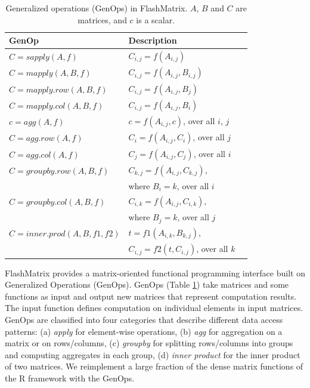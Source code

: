 \begin{table}
\begin{center}
\footnotesize
\begin{tabular}{|l|l|l|}
\hline
GenOp & Description \\
\hline
$C=sapply(A, f)$ & $C_{i,j}=f(A_{i,j})$ \\
\hline
$C=mapply(A, B, f)$ & $C_{i,j}=f(A_{i,j}, B_{i,j})$ \\
\hline
$C=mapply.row(A, B, f)$ & $C_{i,j}=f(A_{i,j}, B_j)$ \\
\hline
$C=mapply.col(A, B, f)$ & $C_{i,j}=f(A_{i,j}, B_i)$ \\
\hline
$c=agg(A, f)$ & $c=f(A_{i,j}, c)$, over all $i$, $j$ \\
\hline
$C=agg.row(A, f)$ & $C_i=f(A_{i,j}, C_i)$, over all $j$ \\
\hline
$C=agg.col(A, f)$ & $C_j=f(A_{i,j}, C_j)$, over all $i$ \\
\hline
$C=groupby.row(A, B, f)$ & $C_{k,j}=f(A_{i,j}, C_{k,j})$,\\ & where $B_i=k$, over all $i$ \\
\hline
$C=groupby.col(A, B, f)$ & $C_{i,k}=f(A_{i,j}, C_{i,k})$,\\ & where $B_j=k$, over all $j$ \\
\hline
$C=inner.prod(A, B, f1, f2)$ & $t=f1(A_{i,k}, B_{k,j})$,
\\ & $C_{i,j}=f2(t, C_{i,j})$, over all $k$ \\
\hline
\end{tabular}
\normalsize
\end{center}
\vspace{-12pt}
\caption{Generalized operations (GenOps) in FlashMatrix.
$A$, $B$ and $C$ are matrices, and $c$ is a scalar.}
\label{tbl:genops}
\vspace{-10pt}
\end{table}

FlashMatrix provides a matrix-oriented functional programming interface
built on Generalized Operations (GenOps).  GenOps (Table \ref{tbl:genops}) take matrices and
some functions as input and output new matrices that represent computation results.
The input function defines computation on individual elements in input matrices.
GenOps are classified into four categories that describe
different data access patterns: (a) \textit{apply} for
element-wise operations, (b) \textit{agg} for aggregation on a matrix
or on rows/columns, (c) \textit{groupby} for splitting rows/columns
into groups and computing aggregates in each group,
(d) \textit{inner product} for the inner product of two matrices.
We reimplement a large fraction of the dense matrix functions of
the R framework with the GenOps.

